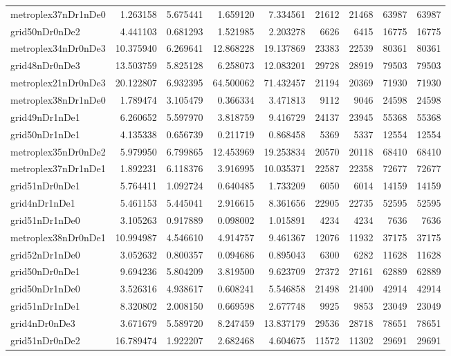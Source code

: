 \begin{longtable}{|l|r|r|r|r|r|r|r|r|}
metroplex37nDr1nDe0 & 1.263158 & 5.675441 & 1.659120 & 7.334561 & 21612 & 21468 & 63987 & 63987 \\
grid50nDr0nDe2 & 4.441103 & 0.681293 & 1.521985 & 2.203278 & 6626 & 6415 & 16775 & 16775 \\
metroplex34nDr0nDe3 & 10.375940 & 6.269641 & 12.868228 & 19.137869 & 23383 & 22539 & 80361 & 80361 \\
grid48nDr0nDe3 & 13.503759 & 5.825128 & 6.258073 & 12.083201 & 29728 & 28919 & 79503 & 79503 \\
metroplex21nDr0nDe3 & 20.122807 & 6.932395 & 64.500062 & 71.432457 & 21194 & 20369 & 71930 & 71930 \\
metroplex38nDr1nDe0 & 1.789474 & 3.105479 & 0.366334 & 3.471813 & 9112 & 9046 & 24598 & 24598 \\
grid49nDr1nDe1 & 6.260652 & 5.597970 & 3.818759 & 9.416729 & 24137 & 23945 & 55368 & 55368 \\
grid50nDr1nDe1 & 4.135338 & 0.656739 & 0.211719 & 0.868458 & 5369 & 5337 & 12554 & 12554 \\
metroplex35nDr0nDe2 & 5.979950 & 6.799865 & 12.453969 & 19.253834 & 20570 & 20118 & 68410 & 68410 \\
metroplex37nDr1nDe1 & 1.892231 & 6.118376 & 3.916995 & 10.035371 & 22587 & 22358 & 72677 & 72677 \\
grid51nDr0nDe1 & 5.764411 & 1.092724 & 0.640485 & 1.733209 & 6050 & 6014 & 14159 & 14159 \\
grid4nDr1nDe1 & 5.461153 & 5.445041 & 2.916615 & 8.361656 & 22905 & 22735 & 52595 & 52595 \\
grid51nDr1nDe0 & 3.105263 & 0.917889 & 0.098002 & 1.015891 & 4234 & 4234 & 7636 & 7636 \\
metroplex38nDr0nDe1 & 10.994987 & 4.546610 & 4.914757 & 9.461367 & 12076 & 11932 & 37175 & 37175 \\
grid52nDr1nDe0 & 3.052632 & 0.800357 & 0.094686 & 0.895043 & 6300 & 6282 & 11628 & 11628 \\
grid50nDr0nDe1 & 9.694236 & 5.804209 & 3.819500 & 9.623709 & 27372 & 27161 & 62889 & 62889 \\
grid50nDr1nDe0 & 3.526316 & 4.938617 & 0.608241 & 5.546858 & 21498 & 21400 & 42914 & 42914 \\
grid51nDr1nDe1 & 8.320802 & 2.008150 & 0.669598 & 2.677748 & 9925 & 9853 & 23049 & 23049 \\
grid4nDr0nDe3 & 3.671679 & 5.589720 & 8.247459 & 13.837179 & 29536 & 28718 & 78651 & 78651 \\
grid51nDr0nDe2 & 16.789474 & 1.922207 & 2.682468 & 4.604675 & 11572 & 11302 & 29691 & 29691 \\

\end{longtable}
